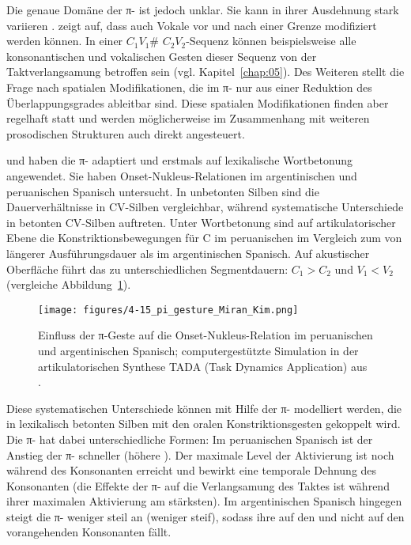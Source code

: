 Die genaue Domäne der π- ist jedoch unklar. Sie kann in ihrer Ausdehnung stark variieren \citep{Byrd2006}. \citet[543--544]{Cho2006} zeigt auf, dass auch Vokale vor und nach einer Grenze modifiziert werden können. In einer ${C}_{1}{V}_{1}$\# ${C}_{2}{V}_{2}${}-Sequenz können beispielsweise alle konsonantischen und vokalischen Gesten dieser Sequenz von der Taktverlangsamung betroffen sein (vgl. Kapitel~\ref{chap:05}). Des Weiteren stellt \citet{Cho2006} die Frage nach spatialen Modifikationen, die im π- nur aus einer Reduktion des Überlappungsgrades ableitbar sind. Diese spatialen Modifikationen finden aber regelhaft statt und werden möglicherweise im Zusammenhang mit weiteren prosodischen Strukturen auch direkt angesteuert.

\citet{Kim2010} und \citet{Kim2011} haben die π- adaptiert und erstmals auf lexikalische Wortbetonung angewendet. Sie haben Onset-Nukleus-Relationen im argentinischen und peruanischen Spanisch untersucht. In unbetonten Silben sind die Dauerverhältnisse in CV-Silben vergleichbar, während systematische Unterschiede in betonten CV-Silben auftreten. Unter Wortbetonung sind auf artikulatorischer Ebene die Konstriktionsbewegungen für C im peruanischen im Vergleich zum  von längerer Ausführungsdauer als im argentinischen Spanisch. Auf akustischer Oberfläche führt das zu unterschiedlichen Segmentdauern: ${C}_{1}>{C}_{2}$ und ${V}_{1}<{V}_{2}$ (vergleiche Abbildung~\ref{figure:0416}).

\begin{figure}
	\texttt{[image: figures/4-15\_pi\_gesture\_Miran\_Kim.png]}
	\caption{Einfluss der π-Geste auf die Onset-Nukleus-Relation im peruanischen und argentinischen Spanisch; computergestützte Simulation in der artikulatorischen Synthese TADA (Task Dynamics Application) aus \citet[151]{Kim2011}.}
	\label{figure:0416}
\end{figure}

Diese systematischen Unterschiede können mit Hilfe der π- modelliert werden, die in lexikalisch betonten Silben mit den oralen Konstriktionsgesten gekoppelt wird. Die π- hat dabei unterschiedliche Formen: Im peruanischen Spanisch ist der Anstieg der π- schneller (höhere ). Der maximale Level der Aktivierung ist noch während des Konsonanten erreicht und bewirkt eine temporale Dehnung des Konsonanten (die Effekte der π- auf die Verlangsamung des Taktes ist während ihrer maximalen Aktivierung am stärksten). Im argentinischen Spanisch hingegen steigt die π- weniger steil an (weniger steif), sodass ihre  auf den  und nicht auf den vorangehenden Konsonanten fällt.

